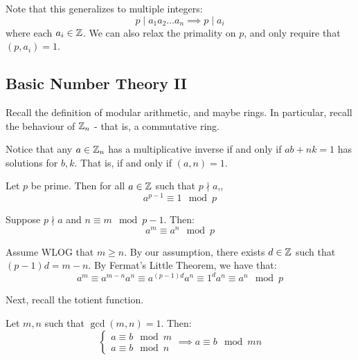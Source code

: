 \documentclass{article}
\begin{document}
Note that this generalizes to multiple integers:
\begin{equation*}
    p \mid a_{1}a_{2}\dots a_{n} \implies p \mid a_{i}
\end{equation*}
where each $ a_{i} \in \mathbb{Z} $. We can also relax the primality on $ p $,
and only require that $ (p, a_{i}) = 1 $.

\newpage
\subsection{Basic Number Theory II}

Recall the definition of modular arithmetic, and maybe rings.
In particular, recall the behaviour of $ \mathbb{Z}_{n} $ - that is, a commutative ring.

Notice that any $ a \in \mathbb{Z}_{n} $ has a multiplicative inverse if and only if 
$ ab + nk = 1 $ has solutions for $ b, k $. That is, if and only if $ (a, n) = 1 $.


\begin{thm}[title=Fermat's Little Theorem]
    Let $ p $ be prime. Then for all $ a \in \mathbb{Z} $ such that $ p \nmid a $,,
    \begin{equation*}
        a^{p-1} \equiv 1 \mod p
    \end{equation*}
\end{thm}

\begin{thm}
    Suppose $ p \nmid a $ and $ n \equiv m \mod p-1 $. Then:
    \begin{equation*}
        a^{m} \equiv a^{n} \mod p
    \end{equation*}
\end{thm}

\begin{pf}[source=Primary Source Material]
    Assume WLOG that $ m \geq n $.
    By our assumption, there exists $ d \in \mathbb{Z} $ such that $ (p-1)d = m-n $.
    By Fermat's Little Theorem, we have that:
    \begin{equation*}
        a^{m} \equiv a^{m-n}a^{n} \equiv a^{(p-1)d}a^{n} \equiv 1^{d}a^{n} \equiv a^{n} \mod p
    \end{equation*}
\end{pf}

Next, recall the totient function.

\begin{lm}
    Let $ m, n $ such that $ \gcd(m, n) = 1 $. Then:
    \begin{equation*}
        \begin{cases} a \equiv b \mod m \\ a \equiv b \mod n \end{cases} \implies a \equiv b \mod mn
    \end{equation*}
\end{lm}
\end{document}
